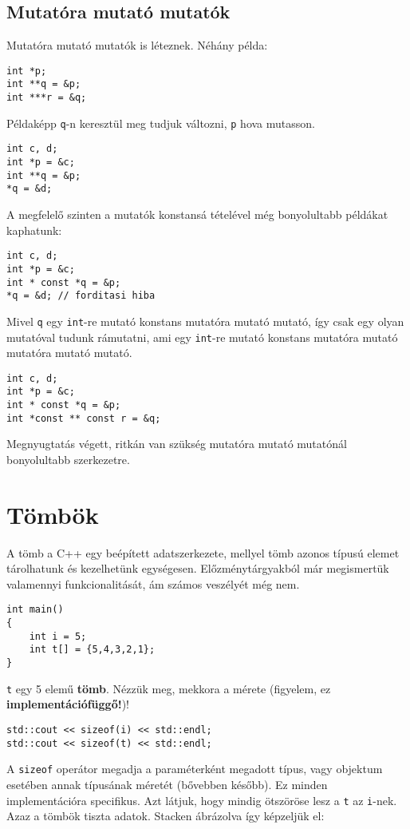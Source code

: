 \documentclass[../cpp_book/cpp_book.tex]{subfiles}
\begin{document}
	\subsection{Mutatóra mutató mutatók} 
	Mutatóra mutató mutatók is léteznek. Néhány példa:
	\begin{lstlisting}
int *p;
int **q = &p;
int ***r = &q;
	\end{lstlisting}
	Példaképp \texttt{q}-n keresztül meg tudjuk változni, \texttt{p} hova mutasson.
	\begin{lstlisting}
int c, d;
int *p = &c;
int **q = &p;
*q = &d;
	\end{lstlisting}
	A megfelelő szinten a mutatók konstansá tételével még bonyolultabb példákat kaphatunk:
	\begin{lstlisting}
int c, d;
int *p = &c;
int * const *q = &p;
*q = &d; // forditasi hiba
	\end{lstlisting}
	Mivel \texttt{q} egy \texttt{int}-re mutató konstans mutatóra mutató mutató, így csak egy olyan mutatóval tudunk rámutatni, ami egy \texttt{int}-re mutató konstans mutatóra mutató mutatóra mutató mutató.
	\begin{lstlisting}
int c, d;
int *p = &c;
int * const *q = &p;
int *const ** const r = &q;
	\end{lstlisting}
	\begin{note}
		Megnyugtatás végett, ritkán van szükség mutatóra mutató mutatónál bonyolultabb szerkezetre.
	\end{note}\section{Tömbök}
	A tömb a C++ egy beépített adatszerkezete, mellyel tömb azonos típusú elemet tárolhatunk és kezelhetünk egységesen. Előzménytárgyakból már megismertük valamennyi funkcionalitását, ám számos veszélyét még nem.
	\begin{lstlisting}
int main()
{
	int i = 5;
	int t[] = {5,4,3,2,1};
}
	\end{lstlisting}
	\texttt{t} egy 5 elemű \textbf{tömb}. Nézzük meg, mekkora a mérete (figyelem, ez \textbf{implementációfüggő!})!
	\begin{lstlisting}
std::cout << sizeof(i) << std::endl;
std::cout << sizeof(t) << std::endl;
	\end{lstlisting}
	A \texttt{sizeof} operátor megadja a paraméterként megadott típus, vagy objektum esetében annak típusának méretét (bővebben később). Ez minden implementációra specifikus. Azt látjuk, hogy mindig ötszöröse lesz a \texttt{t} az \texttt{i}-nek. Azaz a tömbök tiszta adatok.  Stacken ábrázolva így képzeljük el:
	
\end{document}
